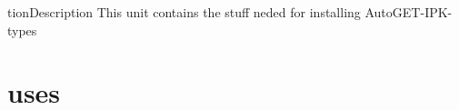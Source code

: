 \documentclass{report}
\begin{document}
tion{Description}
This unit contains the stuff neded for installing AutoGET{-}IPK{-}types
\section{uses}
\end{document}
